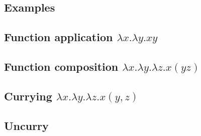 \documentclass{article}
\theoremstyle{definition}
\begin{document}
\newpage
\begin{appendices}
		
    \begin{landscape}
    	\section{Examples}
        \subsection{Function application \texorpdfstring{$\lambda x . \lambda y . x y$}{}}  \label{ex2}
        \newpage\subsection{Function composition \texorpdfstring{$\lambda x . \lambda y . \lambda z . x ( y z)$}{}}  \label{ex7}        
        \newpage\subsection{Currying \texorpdfstring{$\lambda x . \lambda y . \lambda z . x (y, z)$}{}}  \label{ex8}
        \newpage\subsection{Uncurry}  \label{ex9}
    \end{landscape}
\end{appendices}

\newpage

 

\end{document}
